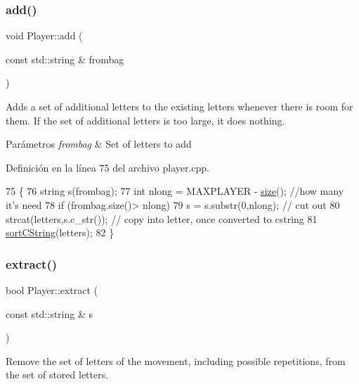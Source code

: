 \subsubsection{\texorpdfstring{add()}{add()}}
{\footnotesize\ttfamily void Player\+::add (\begin{DoxyParamCaption}\item[{const std\+::string \&}]{frombag }\end{DoxyParamCaption})}



Adds a set of additional letters to the existing letters whenever there is room for them. If the set of additional letters is too large, it does nothing. 


\begin{DoxyParams}{Parámetros}
{\em frombag} & Set of letters to add \\
\hline
\end{DoxyParams}


Definición en la línea 75 del archivo player.\+cpp.


\begin{DoxyCode}
75                                           \{
76     \textcolor{keywordtype}{string} s(frombag);
77     \textcolor{keywordtype}{int} nlong = MAXPLAYER - \hyperlink{classPlayer_a706f8e7eb9f430881ce2c96e6f525b62}{size}();  \textcolor{comment}{//how many it's need}
78     \textcolor{keywordflow}{if} (frombag.size()> nlong)
79         s = s.substr(0,nlong);  \textcolor{comment}{// cut out }
80     strcat(letters,s.c\_str());  \textcolor{comment}{// copy into letter, once converted to cstring}
81     \hyperlink{player_8cpp_a97c5e8973d285e26e0395a10700f19c1}{sortCString}(letters);
82 \}
\end{DoxyCode}
\mbox{\label{classPlayer_a4fccb524224366a9fc30ff16042686c1}} 
\subsubsection{\texorpdfstring{extract()}{extract()}}
{\footnotesize\ttfamily bool Player\+::extract (\begin{DoxyParamCaption}\item[{const std\+::string \&}]{s }\end{DoxyParamCaption})}



Remove the set of letters of the movement, including possible repetitions, from the set of stored letters. 


